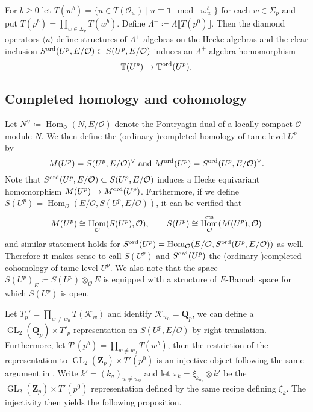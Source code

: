 \documentclass[leqno]{amsart}
\theoremstyle{definition}
\theoremstyle{remark}
\newcommand{\id}{\mathbf{1}}
\newcommand{\oo}{\mathcal{O}}
\newcommand{\Qp}{\mathbf{Q}_p}
\newcommand{\Zp}{\mathbf{Z}_p}
\DeclareMathOperator{\Hom}{Hom}
\DeclareMathOperator{\GL}{GL}
\newcommand{\cts}{\textnormal{cts}}
\newcommand{\K}{{\mathcal{K}}} %
\newcommand{\wt}[1]{\underline{ #1 }}
\newcommand{\TT}{\mathbb{T}} %
\newcommand{\ord}{\textnormal{ord}} %
\begin{document}
For $b\geq 0$ let
$T(w^b)=\{u\in T(\oo_w)\mid u\equiv \id \mod\varpi_w^b\}$
for each $w\in \Sigma_p$ and put $T(p^b)=\prod_{w\in\Sigma_p}T(w^b)$.
Define $\Lambda^+\coloneqq\Lambda\llbracket T(p^0)\rrbracket$.
Then the diamond operators $\langle u\rangle$ 
define structures of $\Lambda^+$-algebras on the Hecke algebras
and the clear inclusion $S^{\ord}(U^p,E/\oo)\subset S(U^p,E/\oo)$
induces an $\Lambda^+$-algebra homomorphism
\[
\TT(U^p)\to \TT^{\ord}(U^p).
\]



\subsection{Completed homology and cohomology}

Let $N^\vee\coloneqq \Hom_\oo(N,E/\oo)$ denote 
the Pontryagin dual of a locally compact $\oo$-module $N$. We then define
the (ordinary-)completed homology of tame level $U^p$ by
\[
    M(U^p)=S(U^p,E/\oo)^\vee\text{ and }
    M^{\ord}(U^p)=S^{\ord}(U^p,E/\oo)^\vee.
\]
Note that $S^{\ord}(U^p,E/\oo)\subset S(U^p,E/\oo)$ 
induces a Hecke equivariant homomorphism
$M(U^p)\to M^{\ord}(U^p)$.
Furthermore, if we define $S(U^p)=\Hom_\oo(E/\oo, S(U^p,E/\oo))$,
it can be verified that 
\begin{equation*}
	M(U^p)\cong \Hom_\oo(S(U^p),\oo),\qquad
	S(U^p)\cong \Hom_\oo^{\cts}(M(U^p),\oo)
\end{equation*}
and similar statement holds for 
$S^{\ord}(U^p)=\Hom_\oo(E/\oo, S^{\ord}(U^p,E/\oo))$ as well.
Therefore it makes sense to call $S(U^p)$ and $S^{\ord}(U^p)$
the (ordinary-)completed cohomology of tame level $U^p$.
We also note that the space $S(U^p)_E\coloneqq S(U^p)\otimes_\oo E$
is equipped with a structure of $E$-Banach space
for which $S(U^p)$ is open.

Let $T_p'=\prod_{w\neq w_0}T(\K_w)$ and identify $\K_{w_0}=\Qp$,
we can define a $\GL_2(\Qp)\times T'_p$-representation on
$S(U^p,E/\oo)$ by right translation.
Furthermore, let $T'(p^b)=\prod_{w\neq w_0}T(w^b)$, 
then the restriction of the representation to $\GL_2(\Zp)\times T'(p^0)$
is an injective object following the same argument in \cite[\S 3]{pan}.
Write $\wt{k}'=(k_\sigma)_{w\neq w_0}$ and let 
$\pi_{\wt{k}}=\xi_{k_{\sigma_0}}\otimes \wt{k}'$ be
the $\GL_2(\Zp)\times T'(p^0)$ representation
defined by the same recipe defining $\xi_{\wt{k}}$.
The injectivity then yields the following proposition.
\end{document}
